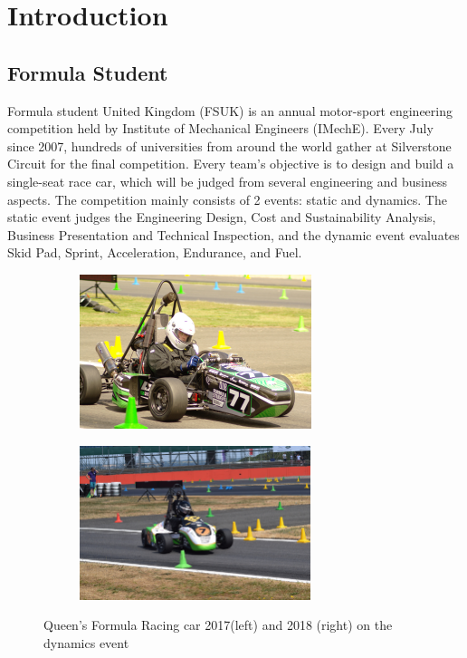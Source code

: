 \newpage
\setcounter{page}{1}
\justifying
\noindent

\section{Introduction}
\subsection{Formula Student}
Formula student United Kingdom (FSUK) is an annual motor-sport engineering competition held by Institute of Mechanical Engineers (IMechE). Every July since 2007, hundreds of universities from around the world gather at Silverstone Circuit for the final competition. Every team's objective is to design and build a single-seat race car, which will be judged from several engineering and business aspects. The competition mainly consists of 2 events: static and dynamics. The static event judges the Engineering  Design,  Cost and  Sustainability  Analysis, Business Presentation and Technical Inspection, and the dynamic event evaluates Skid Pad, Sprint, Acceleration, Endurance, and Fuel.

\begin{figure}[!ht]
\begin{center}
%    
  \begin{subfigure}[b]{0.45\textwidth}
    \includegraphics[height=4.5cm]{Figures/QFR17PHOTO.JPG}
  \end{subfigure}
  \begin{subfigure}[b]{0.45\textwidth}
    \includegraphics[height=4.5cm]{Figures/QFR18PHOTO.jpg}
  \end{subfigure}
%  
  \caption{Queen's Formula Racing car 2017(left) and 2018 (right) on the dynamics event}
    \label{fig:1}
\end{center}
\end{figure}


